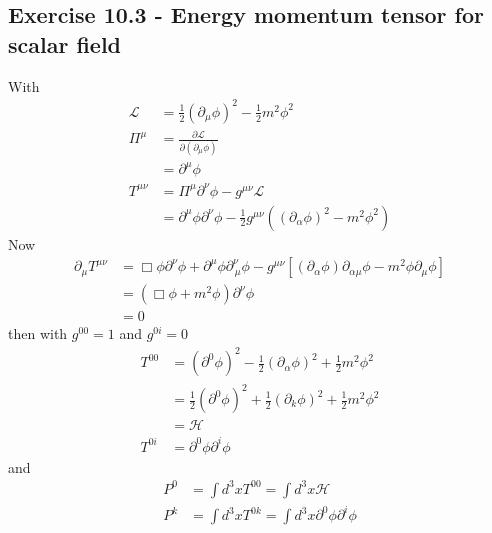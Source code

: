 \documentclass[../main.tex]{subfiles}
\begin{document}
\subsection*{Exercise 10.3 - Energy momentum tensor for scalar field}
With
\begin{align}
\mathcal{L}&=\frac{1}{2}(\partial_\mu\phi)^2-\frac{1}{2}m^2\phi^2\\
\Pi^\mu&=\frac{\partial\mathcal{L}}{\partial(\partial_\mu\phi)}\\
&=\partial^\mu\phi\\
T^{\mu\nu}&=\Pi^\mu\partial^\nu\phi-g^{\mu\nu}\mathcal{L}\\
&=\partial^\mu\phi\partial^\nu\phi-\frac{1}{2}g^{\mu\nu}((\partial_\alpha\phi)^2-m^2\phi^2)
\end{align}
Now
\begin{align}
\partial_\mu T^{\mu\nu}&=\Box\phi\partial^\nu\phi+\partial^\mu\phi\partial^\nu_{\,\mu}\phi-g^{\mu\nu}\left[(\partial_\alpha\phi)\partial_{\alpha\mu}\phi-m^2\phi\partial_\mu\phi\right]\\
&=(\Box\phi+m^2\phi)\partial^\nu\phi\\
&=0
\end{align}
then with $g^{00}=1$ and $g^{0i}=0$
\begin{align}
T^{00}
&=(\partial^0\phi)^2-\frac{1}{2}(\partial_\alpha\phi)^2+\frac{1}{2}m^2\phi^2\\
&=\frac{1}{2}(\partial^0\phi)^2+\frac{1}{2}(\partial_k\phi)^2+\frac{1}{2}m^2\phi^2\\
&=\mathcal{H}\\
T^{0i}
&=\partial^0\phi\partial^i\phi
\end{align}
and
\begin{align}
P^0&=\int d^3xT^{00}=\int d^3x\mathcal{H}\\
P^k&=\int d^3xT^{0k}=\int d^3x\partial^0\phi\partial^i\phi
\end{align}
\end{document}
